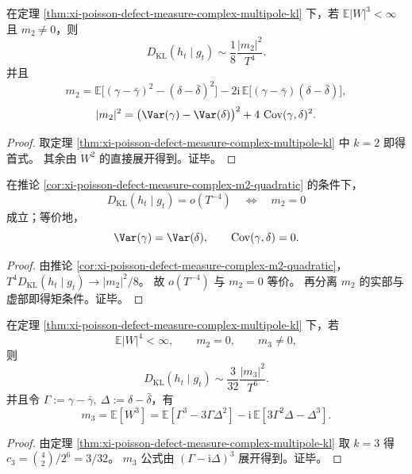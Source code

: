 \begin{corollary}[二阶主项的协方差二次型表达]\label{cor:xi-poisson-defect-measure-complex-m2-quadratic}
在定理 \ref{thm:xi-poisson-defect-measure-complex-multipole-kl} 下，若
\(
\mathbb E|W|^3<\infty
\)
且 \(m_2\neq 0\)，则
\[
D_{\mathrm{KL}}(h_t\mid g_t)\sim \frac{1}{8}\frac{|m_2|^2}{T^4}.
\]
并且
\[
m_2=\mathbb E\!\big[(\gamma-\bar\gamma)^2-(\delta-\bar\delta)^2\big]
-2\mathrm{i}\,\mathbb E\!\big[(\gamma-\bar\gamma)(\delta-\bar\delta)\big],
\]
\[
|m_2|^2=
\bigl(\Var(\gamma)-\Var(\delta)\bigr)^2+4\,\operatorname{Cov}(\gamma,\delta)^2.
\]
\end{corollary}
\begin{proof}
取定理 \ref{thm:xi-poisson-defect-measure-complex-multipole-kl} 中 \(k=2\) 即得首式。
其余由 \(W^2\) 的直接展开得到。证毕。
\end{proof}

\begin{corollary}[超四次衰减与二阶各向同性消失的等价性]\label{cor:xi-poisson-defect-measure-superquartic-iff-m2zero}
在推论 \ref{cor:xi-poisson-defect-measure-complex-m2-quadratic} 的条件下，
\[
D_{\mathrm{KL}}(h_t\mid g_t)=o(T^{-4})
\quad\Longleftrightarrow\quad
m_2=0
\]
成立；等价地，
\[
\Var(\gamma)=\Var(\delta),\qquad \operatorname{Cov}(\gamma,\delta)=0.
\]
\end{corollary}
\begin{proof}
由推论 \ref{cor:xi-poisson-defect-measure-complex-m2-quadratic}，
\(
T^4D_{\mathrm{KL}}(h_t\mid g_t)\to |m_2|^2/8
\)。
故 \(o(T^{-4})\) 与 \(m_2=0\) 等价。
再分离 \(m_2\) 的实部与虚部即得矩条件。证毕。
\end{proof}

\begin{corollary}[二阶隐身后的首个可见项]\label{cor:xi-poisson-defect-measure-m2zero-m3-leading}
在定理 \ref{thm:xi-poisson-defect-measure-complex-multipole-kl} 下，若
\[
\mathbb E|W|^4<\infty,\qquad
m_2=0,\qquad
m_3\neq 0,
\]
则
\[
D_{\mathrm{KL}}(h_t\mid g_t)\sim \frac{3}{32}\frac{|m_3|^2}{T^6}.
\]
并且令
\(
\Gamma:=\gamma-\bar\gamma,\ \Delta:=\delta-\bar\delta
\)，有
\[
m_3=\mathbb E[W^3]
=\mathbb E\!\left[\Gamma^3-3\Gamma\Delta^2\right]
-\mathrm{i}\,\mathbb E\!\left[3\Gamma^2\Delta-\Delta^3\right].
\]
\end{corollary}
\begin{proof}
由定理 \ref{thm:xi-poisson-defect-measure-complex-multipole-kl} 取 \(k=3\) 得
\(
c_3=\binom{4}{2}/2^6=3/32
\)。
\(m_3\) 公式由 \((\Gamma-\mathrm{i}\Delta)^3\) 展开得到。证毕。
\end{proof}

